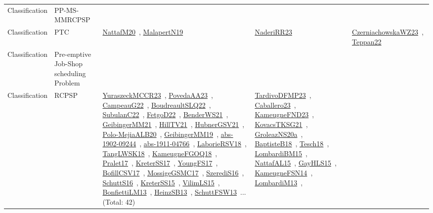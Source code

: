 {\begin{longtable}{lp{3cm}>{\raggedright\arraybackslash}p{6cm}>{\raggedright\arraybackslash}p{6cm}>{\raggedright\arraybackslash}p{8cm}}
Classification & PP-MS-MMRCPSP &  &  & \\
Classification & PTC & \href{works/NattafM20.pdf}{NattafM20}~\cite{NattafM20}, \href{works/MalapertN19.pdf}{MalapertN19}~\cite{MalapertN19} & \href{works/NaderiRR23.pdf}{NaderiRR23}~\cite{NaderiRR23} & \href{works/CzerniachowskaWZ23.pdf}{CzerniachowskaWZ23}~\cite{CzerniachowskaWZ23}, \href{works/Teppan22.pdf}{Teppan22}~\cite{Teppan22}\\
Classification & Pre-emptive Job-Shop scheduling Problem &  &  & \\
Classification & RCPSP & \href{works/YuraszeckMCCR23.pdf}{YuraszeckMCCR23}~\cite{YuraszeckMCCR23}, \href{works/PovedaAA23.pdf}{PovedaAA23}~\cite{PovedaAA23}, \href{works/CampeauG22.pdf}{CampeauG22}~\cite{CampeauG22}, \href{works/BoudreaultSLQ22.pdf}{BoudreaultSLQ22}~\cite{BoudreaultSLQ22}, \href{works/SubulanC22.pdf}{SubulanC22}~\cite{SubulanC22}, \href{works/FetgoD22.pdf}{FetgoD22}~\cite{FetgoD22}, \href{works/BenderWS21.pdf}{BenderWS21}~\cite{BenderWS21}, \href{works/GeibingerMM21.pdf}{GeibingerMM21}~\cite{GeibingerMM21}, \href{works/HillTV21.pdf}{HillTV21}~\cite{HillTV21}, \href{works/HubnerGSV21.pdf}{HubnerGSV21}~\cite{HubnerGSV21}, \href{works/Polo-MejiaALB20.pdf}{Polo-MejiaALB20}~\cite{Polo-MejiaALB20}, \href{works/GeibingerMM19.pdf}{GeibingerMM19}~\cite{GeibingerMM19}, \href{works/abs-1902-09244.pdf}{abs-1902-09244}~\cite{abs-1902-09244}, \href{works/abs-1911-04766.pdf}{abs-1911-04766}~\cite{abs-1911-04766}, \href{works/LaborieRSV18.pdf}{LaborieRSV18}~\cite{LaborieRSV18}, \href{works/TangLWSK18.pdf}{TangLWSK18}~\cite{TangLWSK18}, \href{works/KameugneFGOQ18.pdf}{KameugneFGOQ18}~\cite{KameugneFGOQ18}, \href{works/Pralet17.pdf}{Pralet17}~\cite{Pralet17}, \href{works/KreterSS17.pdf}{KreterSS17}~\cite{KreterSS17}, \href{works/YoungFS17.pdf}{YoungFS17}~\cite{YoungFS17}, \href{works/BofillCSV17.pdf}{BofillCSV17}~\cite{BofillCSV17}, \href{works/MossigeGSMC17.pdf}{MossigeGSMC17}~\cite{MossigeGSMC17}, \href{works/SzerediS16.pdf}{SzerediS16}~\cite{SzerediS16}, \href{works/SchuttS16.pdf}{SchuttS16}~\cite{SchuttS16}, \href{works/KreterSS15.pdf}{KreterSS15}~\cite{KreterSS15}, \href{works/VilimLS15.pdf}{VilimLS15}~\cite{VilimLS15}, \href{works/BonfiettiLM13.pdf}{BonfiettiLM13}~\cite{BonfiettiLM13}, \href{works/HeinzSB13.pdf}{HeinzSB13}~\cite{HeinzSB13}, \href{works/SchuttFSW13.pdf}{SchuttFSW13}~\cite{SchuttFSW13}... (Total: 42) & \href{works/TardivoDFMP23.pdf}{TardivoDFMP23}~\cite{TardivoDFMP23}, \href{works/Caballero23.pdf}{Caballero23}~\cite{Caballero23}, \href{works/KameugneFND23.pdf}{KameugneFND23}~\cite{KameugneFND23}, \href{works/KovacsTKSG21.pdf}{KovacsTKSG21}~\cite{KovacsTKSG21}, \href{works/GroleazNS20a.pdf}{GroleazNS20a}~\cite{GroleazNS20a}, \href{works/BaptisteB18.pdf}{BaptisteB18}~\cite{BaptisteB18}, \href{works/Tesch18.pdf}{Tesch18}~\cite{Tesch18}, \href{works/LombardiBM15.pdf}{LombardiBM15}~\cite{LombardiBM15}, \href{works/NattafAL15.pdf}{NattafAL15}~\cite{NattafAL15}, \href{works/GayHLS15.pdf}{GayHLS15}~\cite{GayHLS15}, \href{works/KameugneFSN14.pdf}{KameugneFSN14}~\cite{KameugneFSN14}, \href{works/LombardiM13.pdf}{LombardiM13}~\cite{LombardiM13}, 
\end{longtable}}
